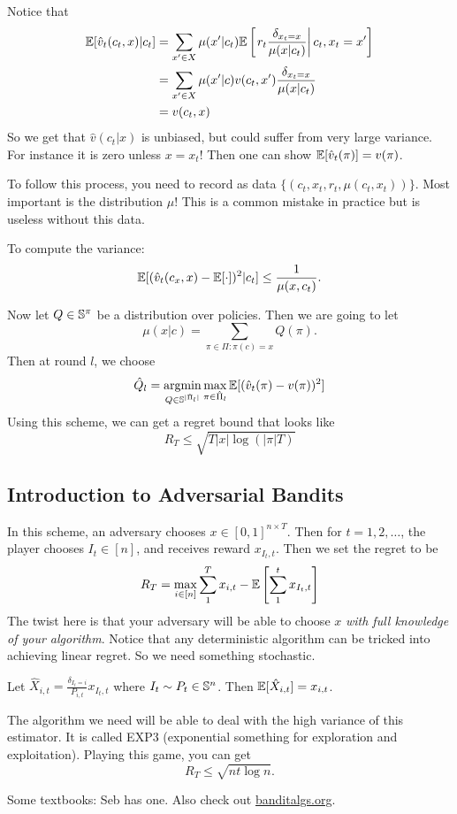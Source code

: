 \documentclass[12pt]{article}
\DeclareMathOperator*{\argmin}{argmin}
\begin{document}
Notice that 
\begin{align*}
	\mathbb{E}[\hat v_t(c_t,x)|c_t] &= \sum_{x'\in X}\mu(x'|c_t)\mathbb{E}\left[\left.r_t\frac{\delta_{x_t=x}}{\mu(x|c_t)}\right| c_t,x_t=x'\right]\\
	&=\sum_{x'\in X}\mu(x'|c)v(c_t,x')\frac{\delta_{x_t=x}}{\mu(x|c_t)}\\
	&=v(c_t,x)
\end{align*}
So we get that $\hat v(c_t|x)$ is unbiased, but could suffer from very large variance. For instance it is zero unless $x=x_t$!
Then one can show $\mathbb{E}[\hat v_t(\pi)]=v(\pi)$.
\begin{rmk}
	To follow this process, you need to record as data $\{(c_t,x_t,r_t,\mu(c_t,x_t))\}$. Most important is the distribution $\mu$! This is a common mistake in practice but is useless without this data.
\end{rmk}

To compute the variance:
\[\mathbb{E}[(\hat v_t(c_x,x)-\mathbb{E}[\cdot])^2|c_t]\le\frac{1}{\mu(x,c_t)}.\]

Now let $Q\in \mathbb{S}^{\pi}$ be a distribution over policies. Then we are going to let 
\[\mu(x|c)=\sum_{\pi\in\Pi:\pi(c)=x}Q(\pi).\]
Then at round $l$, we choose 
\[\hat Q_l=\argmin_{Q\in\bbS^{|\hat\Pi_l|}}\max_{\pi\in\hat\Pi_l}\bbE[(\hat v_t(\pi)-v(\pi))^2]\]
Using this scheme, we can get a regret bound that looks like 
\[R_T\le\sqrt{T|x|\log(|\pi|T)}\]
\subsection{Introduction to Adversarial Bandits}
In this scheme, an adversary chooses $x\in[0,1]^{n\times T}$. Then for $t=1,2,\dots$, the player chooses $I_t\in[n]$, and receives reward $x_{I_t,t}$.
Then we set the regret to be 
\[R_T=\max_{i\in[n]}\sum_1^Tx_{i,t}-\mathbb{E}\left[\sum_1^t x_{I_t,t}\right]\]
The twist here is that your adversary will be able to choose $x$ \textit{with full knowledge of your algorithm}. Notice that any deterministic algorithm can be tricked into achieving linear regret. So we need something stochastic.

Let $\hat X_{i,t}=\frac{\delta_{I_t=i}}{P_{i,t}}x_{I_t,t}$ where $I_t\sim P_t\in\mathbb{S}^n$. Then $\mathbb{E}[\hat X_{i,t}]=x_{i,t}$.

The algorithm we need will be able to deal with the high variance of this estimator. It is called EXP3 (exponential something for exploration and exploitation). Playing this game, you can get 
\[R_T\le\sqrt{nt\log n}.\]

Some textbooks: Seb has one. Also check out \href{banditalgs.org}{banditalgs.org}.
\end{document}
